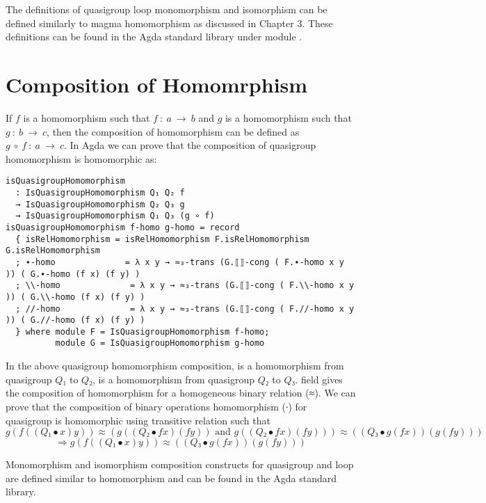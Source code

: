 The definitions of quasigroup loop monomorphism and isomorphism can be defined
similarly to magma homomorphism as discussed in Chapter 3. These definitions can
be found in the Agda standard library under module
.

\section{Composition of Homomrphism}
If $f$ is a homomorphism such that $f\ :\ a \ \rightarrow \ b$ and $g$ is a
homomorphism such that $g\ :\ b\ \rightarrow \ c$, then the composition of
homomorphism can be defined as $g \ ∘\ f\ :\ a \ \rightarrow \ c$. In Agda we
can prove that the composition of quasigroup homomorphism is homomorphic as:

\begin{verbatim}
isQuasigroupHomomorphism
  : IsQuasigroupHomomorphism Q₁ Q₂ f
  → IsQuasigroupHomomorphism Q₂ Q₃ g
  → IsQuasigroupHomomorphism Q₁ Q₃ (g ∘ f)
isQuasigroupHomomorphism f-homo g-homo = record
  { isRelHomomorphism = isRelHomomorphism F.isRelHomomorphism G.isRelHomomorphism
  ; ∙-homo              = λ x y → ≈₃-trans (G.⟦⟧-cong ( F.∙-homo x y )) ( G.∙-homo (f x) (f y) )
  ; \\-homo              = λ x y → ≈₃-trans (G.⟦⟧-cong ( F.\\-homo x y )) ( G.\\-homo (f x) (f y) )
  ; //-homo              = λ x y → ≈₃-trans (G.⟦⟧-cong ( F.//-homo x y )) ( G.//-homo (f x) (f y) )
  } where module F = IsQuasigroupHomomorphism f-homo; 
          module G = IsQuasigroupHomomorphism g-homo
\end{verbatim}

In the above quasigroup homomorphism composition,  is a homomorphism
from quasigroup $Q₁$ to $Q₂$,  is a homomorphism from quasigroup $Q₂$ to $Q₃$.
 field gives the composition of homomorphism for a
homogeneous binary relation (≈). We can prove that the composition of binary
operations homomorphism (∙) for quasigroup is homomorphic using transitive
relation  such that \[g (f ((Q₁ ∙ x) y)) ≈ (g ((Q₂ ∙ f x) (f
y)) \text{ and } g ((Q₂ ∙ f x) (f y))) ≈ ((Q₃ ∙ g (f x)) (g (f y)))\]
\[\Rightarrow g (f ((Q₁ ∙ x) y)) ≈ ((Q₃ ∙ g (f x)) (g (f y)))\]

Monomorphism and isomorphism composition constructs for quasigroup and loop are
defined similar to homomorphism and can be found in the Agda standard library.

